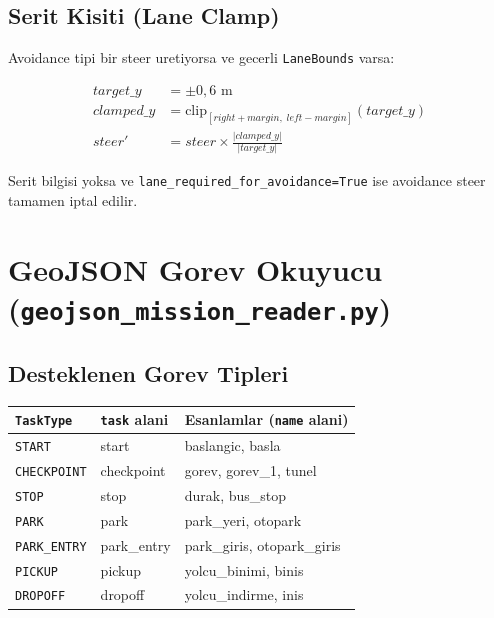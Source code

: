 \documentclass[a4paper,12pt]{article}
\begin{document}
\subsection{Serit Kisiti (Lane Clamp)}

Avoidance tipi bir steer uretiyorsa ve gecerli \texttt{LaneBounds} varsa:

\begin{align}
  target\_y &= \pm 0{,}6 \text{ m}\\
  clamped\_y &= \text{clip}_{[right+margin,\; left-margin]}(target\_y)\\
  steer' &= steer \times \frac{|clamped\_y|}{|target\_y|}
\end{align}

Serit bilgisi yoksa ve \texttt{lane\_required\_for\_avoidance=True} ise
avoidance steer tamamen iptal edilir.

\section{GeoJSON Gorev Okuyucu (\texttt{geojson\_mission\_reader.py})}

\subsection{Desteklenen Gorev Tipleri}

\begin{center}
\begin{tabular}{lll}
  \toprule
  \texttt{TaskType}       & \texttt{task} alani & Esanlamlar (\texttt{name} alani)\\
  \midrule
  \texttt{START}          & start           & baslangic, basla\\
  \texttt{CHECKPOINT}     & checkpoint      & gorev, gorev\_1, tunel\\
  \texttt{STOP}           & stop            & durak, bus\_stop\\
  \texttt{PARK}           & park            & park\_yeri, otopark\\
  \texttt{PARK\_ENTRY}    & park\_entry     & park\_giris, otopark\_giris\\
  \texttt{PICKUP}         & pickup          & yolcu\_binimi, binis\\
  \texttt{DROPOFF}        & dropoff         & yolcu\_indirme, inis\\
  \bottomrule
\end{tabular}
\end{center}
\end{document}
